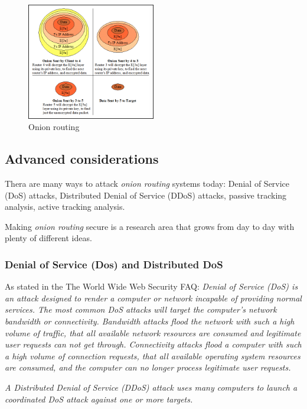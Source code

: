 \documentclass{acm_proc_article-sp}
\begin{document}
\begin{figure}
    \centering
    \includegraphics[width=0.5\textwidth]{anonion.png}
    \caption{Onion routing \cite{cite4}}
    \label{fig:onion_image}
\end{figure}

\subsection{Advanced considerations}

Thera are many ways to attack \textit{onion routing} systems today: Denial of Service (DoS) attacks, Distributed Denial of Service (DDoS) attacks, passive tracking analysis, active tracking analysis.\cite{cite4}

Making \textit{onion routing} secure is a research area that grows from day to day with plenty of different ideas. \cite{cite4}

\subsubsection{Denial of Service (Dos) and Distributed DoS} 

As stated in the The World Wide Web Security FAQ: \textit{Denial of Service (DoS) is an attack designed to render a computer or network incapable of providing normal services. The most common DoS attacks will target the computer's network bandwidth or connectivity. Bandwidth attacks flood the network with such a high volume of traffic, that all available network resources are consumed and legitimate user requests can not get through. Connectivity attacks flood a computer with such a high volume of connection requests, that all available operating system resources are consumed, and the computer can no longer process legitimate user requests.} \cite{cite5}

\textit{A Distributed Denial of Service (DDoS) attack uses many computers to launch a coordinated DoS attack against one or more targets.} \cite{cite5}
\end{document}

